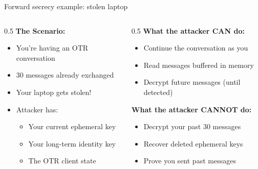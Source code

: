 \ifdefined\PRESENTATION\else\PassOptionsToClass{handout}{beamer}\fi\documentclass[aspectratio=169, lualatex]{beamer}
\begin{document}
\begin{frame}{Forward secrecy example: stolen laptop}
	\begin{columns}[c]
		\begin{column}{0.5\textwidth}
			\textbf{The Scenario:}
			\begin{itemize}
				\item You're having an OTR conversation
				\item 30 messages already exchanged
				\item Your laptop gets stolen!
				\item Attacker has:
				      \begin{itemize}
					      \item Your current ephemeral key
					      \item Your long-term identity key
					      \item The OTR client state
				      \end{itemize}
			\end{itemize}
		\end{column}
		\begin{column}{0.5\textwidth}
			\textbf{What the attacker CAN do:}
			\begin{itemize}
				\item Continue the conversation as you
				\item Read messages buffered in memory
				\item Decrypt future messages (until detected)
			\end{itemize}
			\textbf{What the attacker CANNOT do:}
			\begin{itemize}
				\item Decrypt your past 30 messages
				\item Recover deleted ephemeral keys
				\item Prove you sent past messages
			\end{itemize}
		\end{column}
	\end{columns}
\end{frame}
\end{document}
